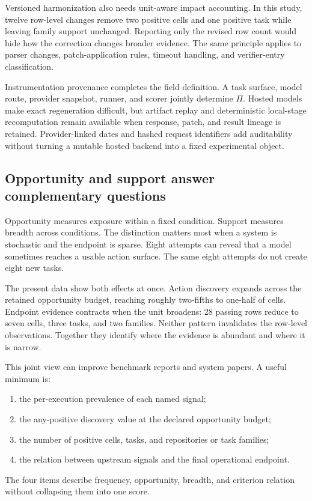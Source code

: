 Versioned harmonization also needs unit-aware impact accounting. In this study, twelve row-level changes remove two positive cells and one positive task while leaving family support unchanged. Reporting only the revised row count would hide how the correction changes broader evidence. The same principle applies to parser changes, patch-application rules, timeout handling, and verifier-entry classification.

Instrumentation provenance completes the field definition. A task surface, model route, provider snapshot, runner, and scorer jointly determine $\Pi$. Hosted models make exact regeneration difficult, but artifact replay and deterministic local-stage recomputation remain available when response, patch, and result lineage is retained. Provider-linked dates and hashed request identifiers add auditability without turning a mutable hosted backend into a fixed experimental object.

\subsection{Opportunity and support answer complementary questions}

Opportunity measures exposure within a fixed condition. Support measures breadth across conditions. The distinction matters most when a system is stochastic and the endpoint is sparse. Eight attempts can reveal that a model sometimes reaches a usable action surface. The same eight attempts do not create eight new tasks.

The present data show both effects at once. Action discovery expands across the retained opportunity budget, reaching roughly two-fifths to one-half of cells. Endpoint evidence contracts when the unit broadens: 28 passing rows reduce to seven cells, three tasks, and two families. Neither pattern invalidates the row-level observations. Together they identify where the evidence is abundant and where it is narrow.

This joint view can improve benchmark reports and system papers. A useful minimum is:
\begin{enumerate}
    \item the per-execution prevalence of each named signal;
    \item the any-positive discovery value at the declared opportunity budget;
    \item the number of positive cells, tasks, and repositories or task families;
    \item the relation between upstream signals and the final operational endpoint.
\end{enumerate}
The four items describe frequency, opportunity, breadth, and criterion relation without collapsing them into one score.

